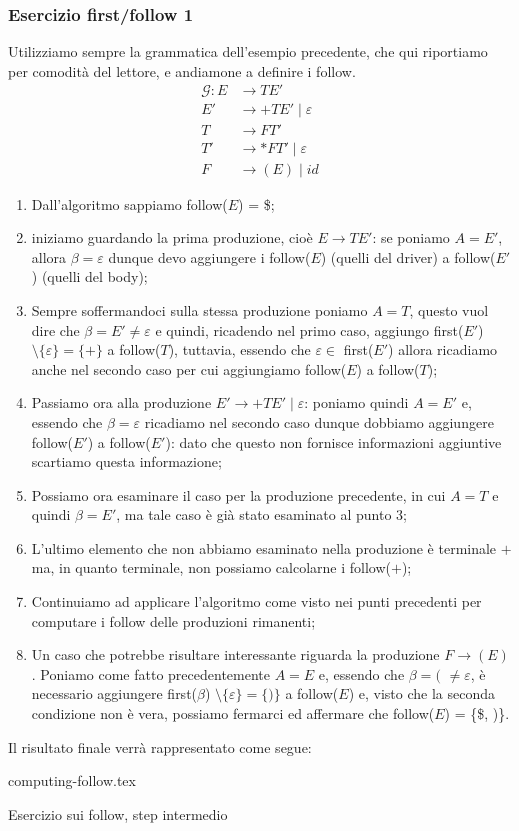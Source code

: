 \documentclass[class=book, crop=false, oneside, 12pt]{standalone}
\begin{document}
\subsubsection{Esercizio first/follow 1}
Utilizziamo sempre la grammatica dell'esempio precedente, che qui riportiamo per comodità del lettore, e andiamone a definire i follow.
\begin{align*}
    \mathcal{G}: E &\rightarrow TE' \\
    E' &\rightarrow +TE' \mid \varepsilon \\
    T &\rightarrow FT' \\
    T' &\rightarrow *FT' \mid \varepsilon\\
    F &\rightarrow (E) \mid id
\end{align*}
\begin{enumerate}
    \item Dall'algoritmo sappiamo follow(\(E\)) = \$;
    \item iniziamo guardando la prima produzione, cioè \(E \rightarrow TE'\): se poniamo \(A = E'\), allora \(\beta = \varepsilon\) dunque devo aggiungere i follow(\(E\)) (quelli del driver) a follow(\(E'\)) (quelli del body);
    \item Sempre soffermandoci sulla stessa produzione poniamo \(A = T\), questo vuol dire che \(\beta = E' \neq \varepsilon\) e quindi, ricadendo nel primo caso, aggiungo first(\(E'\)) \(\setminus \{\varepsilon\} = \{+\}\) a follow(\(T\)), tuttavia, essendo che \(\varepsilon \in\) first(\(E'\)) allora ricadiamo anche nel secondo caso per cui aggiungiamo follow(\(E\)) a follow(\(T\));
    \item Passiamo ora alla produzione \(E' \rightarrow +TE' \mid \varepsilon\): poniamo quindi \(A = E'\) e, essendo che \(\beta = \varepsilon\) ricadiamo nel secondo caso dunque dobbiamo aggiungere follow(\(E'\)) a follow(\(E'\)): dato che questo non fornisce informazioni aggiuntive scartiamo questa informazione;
    \item Possiamo ora esaminare il caso per la produzione precedente, in cui \(A = T\) e quindi \(\beta = E'\), ma tale caso è già stato esaminato al punto 3;
    \item L'ultimo elemento che non abbiamo esaminato nella produzione è terminale \(+\) ma, in quanto terminale, non possiamo calcolarne i follow(\(+\));
    \item Continuiamo ad applicare l'algoritmo come visto nei punti precedenti per computare i follow delle produzioni rimanenti;
    \item Un caso che potrebbe risultare interessante riguarda la produzione \(F \rightarrow (E)\). Poniamo come fatto precedentemente \(A = E\) e, essendo che \(\beta = (\) \(\neq \varepsilon\), è necessario aggiungere first(\(\beta\)) \(\setminus \{\varepsilon\} = \{)\}\) a follow(\(E\)) e, visto che la seconda condizione non è vera, possiamo fermarci ed affermare che follow(\(E\)) = \{\$, )\}.
\end{enumerate}
Il risultato finale verrà rappresentato come segue:
\begin{table}[H]
	\centering
	{computing-follow.tex}
    \caption{Esercizio sui follow, step intermedio}
    \label{computing-follow}
\end{table}
\end{document}
